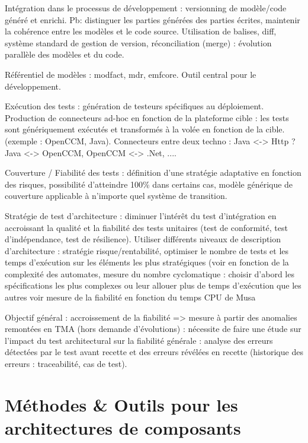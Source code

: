Int\'egration dans le processus de d\'eveloppement : versionning de
mod\`ele/code g\'en\'er\'e et enrichi. Pb: distinguer les parties
g\'en\'er\'ees des parties \'ecrites, maintenir la coh\'erence
entre les mod\`eles et le code source. Utilisation de balises, diff,
syst\`eme standard de gestion de version, r\'econciliation (merge) :
\'evolution parall\`ele des mod\`eles et du code. 

R\'ef\'erentiel de mod\`eles : modfact, mdr, emfcore. Outil central
pour le d\'eveloppement.

Ex\'ecution des tests : g\'en\'eration de testeurs sp\'ecifiques
au d\'eploiement. Production de connecteurs ad-hoc en fonction de la
plateforme cible : les tests sont g\'en\'eriquement ex\'ecut\'es
et transform\'es \`a la vol\'ee en fonction de la cible. (exemple :
OpenCCM, Java). Connecteurs entre deux techno : Java <-> Http ? Java
<-> OpenCCM, OpenCCM <-> .Net, ....

Couverture / Fiabilit\'e des tests : d\'efinition d'une strat\'egie
adaptative en fonction des risques, possibilit\'e d'atteindre 100\%
dans certains cas, mod\`ele g\'en\'erique de couverture applicable
\`a n'importe quel syst\`eme de transition. 

Strat\'egie de test d'architecture : diminuer l'int\'er\^et du test
d'int\'egration en accroissant la qualit\'e et la fiabilit\'e des
tests unitaires (test de conformit\'e, test d'ind\'ependance, test
de r\'esilience). Utiliser diff\'erents niveaux de description
d'architecture : strat\'egie risque/rentabilit\'e, optimiser le
nombre de tests et les temps d'ex\'ecution sur les \'el\'ements les
plus strat\'egiques (voir en fonction de la complexit\'e des
automates, mesure du nombre cyclomatique : choisir d'abord les
sp\'ecifications les plus complexes ou leur allouer plus de temps
d'ex\'ecution que les autres voir mesure de la fiabilit\'e en
fonction du temps CPU de Musa\cite{musa-theory-sr}

Objectif g\'en\'eral : accroissement  de la fiabilit\'e => mesure
\`a partir des anomalies remont\'ees en TMA (hors demande
d'\'evolutions) : n\'ecessite de faire une \'etude sur l'impact du
test architectural sur la fiabilit\'e g\'en\'erale : analyse des
erreurs d\'etect\'ees par le test avant recette et des erreurs
r\'ev\'el\'ees en recette (historique des erreurs :
traceabilit\'e, cas de test).

\section{M\'ethodes \& Outils pour les architectures de composants}

